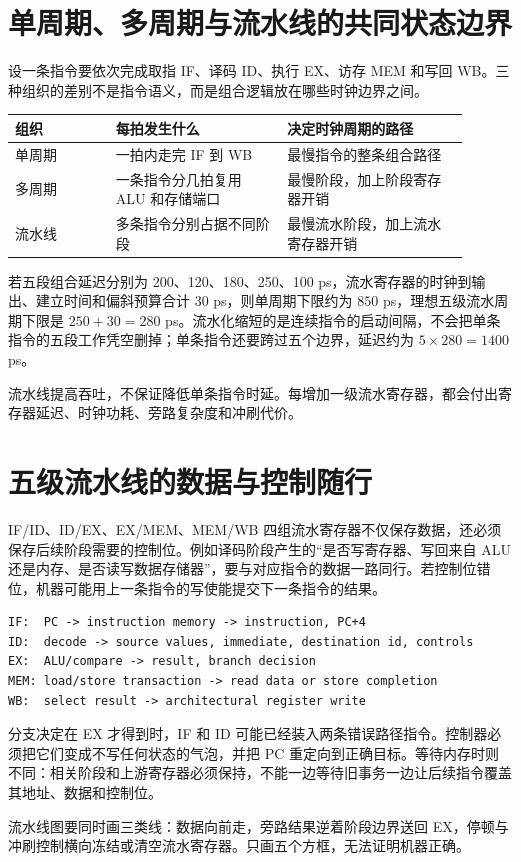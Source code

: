 \section{单周期、多周期与流水线的共同状态边界}

设一条指令要依次完成取指 IF、译码 ID、执行 EX、访存 MEM 和写回 WB。三种组织的差别不是指令语义，而是组合逻辑放在哪些时钟边界之间。

\begin{longtable}{L{0.2\linewidth}L{0.34\linewidth}L{0.36\linewidth}}
\toprule
组织 & 每拍发生什么 & 决定时钟周期的路径 \\
\midrule
单周期 & 一拍内走完 IF 到 WB & 最慢指令的整条组合路径 \\
多周期 & 一条指令分几拍复用 ALU 和存储端口 & 最慢阶段，加上阶段寄存器开销 \\
流水线 & 多条指令分别占据不同阶段 & 最慢流水阶段，加上流水寄存器开销 \\
\bottomrule
\end{longtable}

若五段组合延迟分别为 200、120、180、250、100 ps，流水寄存器的时钟到输出、建立时间和偏斜预算合计 30 ps，则单周期下限约为 $850$ ps，理想五级流水周期下限是 $250+30=280$ ps。流水化缩短的是连续指令的启动间隔，不会把单条指令的五段工作凭空删掉；单条指令还要跨过五个边界，延迟约为 $5\times280=1400$ ps。

\begin{keyidea}
流水线提高吞吐，不保证降低单条指令时延。每增加一级流水寄存器，都会付出寄存器延迟、时钟功耗、旁路复杂度和冲刷代价。
\end{keyidea}

\section{五级流水线的数据与控制随行}

IF/ID、ID/EX、EX/MEM、MEM/WB 四组流水寄存器不仅保存数据，还必须保存后续阶段需要的控制位。例如译码阶段产生的“是否写寄存器、写回来自 ALU 还是内存、是否读写数据存储器”，要与对应指令的数据一路同行。若控制位错位，机器可能用上一条指令的写使能提交下一条指令的结果。

\begin{lstlisting}
IF:  PC -> instruction memory -> instruction, PC+4
ID:  decode -> source values, immediate, destination id, controls
EX:  ALU/compare -> result, branch decision
MEM: load/store transaction -> read data or store completion
WB:  select result -> architectural register write
\end{lstlisting}

分支决定在 EX 才得到时，IF 和 ID 可能已经装入两条错误路径指令。控制器必须把它们变成不写任何状态的气泡，并把 PC 重定向到正确目标。等待内存时则不同：相关阶段和上游寄存器必须保持，不能一边等待旧事务一边让后续指令覆盖其地址、数据和控制位。

\begin{classicnote}
流水线图要同时画三类线：数据向前走，旁路结果逆着阶段边界送回 EX，停顿与冲刷控制横向冻结或清空流水寄存器。只画五个方框，无法证明机器正确。
\end{classicnote}

